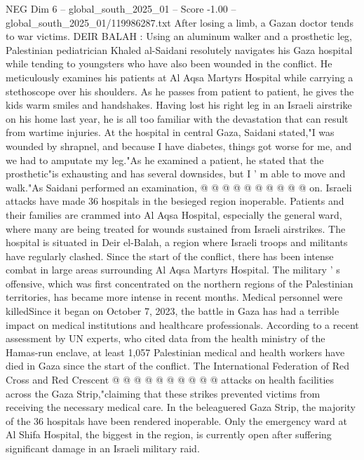 \begin{textsample}{NEG Dim 6 – global\_south\_2025\_01 – Score -1.00 – global\_south\_2025\_01/119986287.txt}  \label{ex:f6_neg_014}
After losing a limb, a Gazan doctor tends to war victims.
DEIR BALAH : Using an aluminum walker and a prosthetic leg, Palestinian pediatrician Khaled al-Saidani resolutely navigates his Gaza hospital while tending to youngsters who have also been wounded in the conflict.
He meticulously examines his patients at Al Aqsa Martyrs Hospital while carrying a stethoscope over his shoulders.
As he passes from patient to patient, he gives the kids warm smiles and handshakes.
Having lost his right leg in an Israeli airstrike on his home last year, he is all too familiar with the devastation that can result from wartime injuries.
At the hospital in central Gaza, Saidani stated,"I was wounded by shrapnel, and because I have diabetes, things got worse for me, and we had to amputate my leg."As he examined a patient, he stated that the prosthetic"is exhausting and has several downsides, but I ' m able to move and walk."As Saidani performed an examination, @ @ @ @ @ @ @ @ @ @ on.
Israeli attacks have made 36 hospitals in the besieged region inoperable.
Patients and their families are crammed into Al Aqsa Hospital, especially the general ward, where many are being treated for wounds sustained from Israeli airstrikes.
The hospital is situated in Deir el-Balah, a region where Israeli troops and militants have regularly clashed.
Since the start of the conflict, there has been intense combat in large areas surrounding Al Aqsa Martyrs Hospital.
The military ' s offensive, which was first concentrated on the northern regions of the Palestinian territories, has became more intense in recent months.
Medical personnel were killedSince it began on October 7, 2023, the battle in Gaza has had a terrible impact on medical institutions and healthcare professionals.
According to a recent assessment by UN experts, who cited data from the health ministry of the Hamas-run enclave, at least 1,057 Palestinian medical and health workers have died in Gaza since the start of the conflict.
The International Federation of Red Cross and Red Crescent @ @ @ @ @ @ @ @ @ @ attacks on health facilities across the Gaza Strip,"claiming that these strikes prevented victims from receiving the necessary medical care.
In the beleaguered Gaza Strip, the majority of the 36 hospitals have been rendered inoperable.
Only the emergency ward at Al Shifa Hospital, the biggest in the region, is currently open after suffering significant damage in an Israeli military raid.

\end{textsample}
